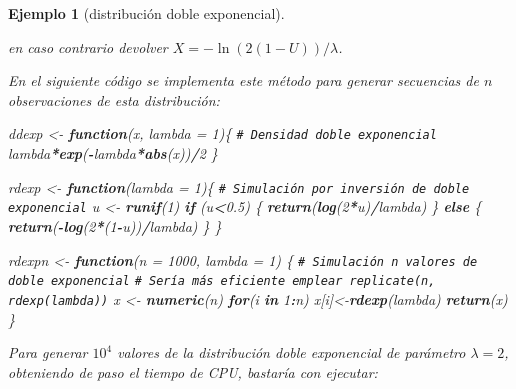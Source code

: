 \documentclass[
  spanish,
  10pt,
]{book}
\newenvironment{Shaded}{\begin{snugshade}}{\end{snugshade}}
\newcommand{\AttributeTok}[1]{\textcolor[rgb]{0.13,0.29,0.53}{#1}}
\newcommand{\CommentTok}[1]{\textcolor[rgb]{0.56,0.35,0.01}{\textit{#1}}}
\newcommand{\ControlFlowTok}[1]{\textcolor[rgb]{0.13,0.29,0.53}{\textbf{#1}}}
\newcommand{\DecValTok}[1]{\textcolor[rgb]{0.00,0.00,0.81}{#1}}
\newcommand{\FloatTok}[1]{\textcolor[rgb]{0.00,0.00,0.81}{#1}}
\newcommand{\FunctionTok}[1]{\textcolor[rgb]{0.13,0.29,0.53}{\textbf{#1}}}
\newcommand{\NormalTok}[1]{#1}
\newcommand{\OtherTok}[1]{\textcolor[rgb]{0.56,0.35,0.01}{#1}}
\newcommand{\SpecialCharTok}[1]{\textcolor[rgb]{0.81,0.36,0.00}{\textbf{#1}}}
\theoremstyle{break}
\newtheorem{example}{Ejemplo}[chapter]
\theoremstyle{nonumberplain}
\renewcommand{\CommentTok}[1]{\textcolor[rgb]{0.41,0.41,0.41}{\texttt{#1}}}
\begin{document}
\begin{example}[distribución doble exponencial]
\begin{enumerate}
  en caso contrario devolver \(X = - \ln \left( 2(1-U) \right)/\lambda\).
\end{enumerate}

En el siguiente código se implementa este método para generar secuencias de \(n\) observaciones de esta distribución:

\begin{Shaded}
\begin{Highlighting}[]
\NormalTok{ddexp }\OtherTok{\textless{}{-}} \ControlFlowTok{function}\NormalTok{(x, }\AttributeTok{lambda =} \DecValTok{1}\NormalTok{)\{}
\CommentTok{\# Densidad doble exponencial}
\NormalTok{  lambda}\SpecialCharTok{*}\FunctionTok{exp}\NormalTok{(}\SpecialCharTok{{-}}\NormalTok{lambda}\SpecialCharTok{*}\FunctionTok{abs}\NormalTok{(x))}\SpecialCharTok{/}\DecValTok{2}
\NormalTok{\}}

\NormalTok{rdexp }\OtherTok{\textless{}{-}} \ControlFlowTok{function}\NormalTok{(}\AttributeTok{lambda =} \DecValTok{1}\NormalTok{)\{}
\CommentTok{\# Simulación por inversión de doble exponencial}
\NormalTok{  u }\OtherTok{\textless{}{-}} \FunctionTok{runif}\NormalTok{(}\DecValTok{1}\NormalTok{)}
  \ControlFlowTok{if}\NormalTok{ (u}\SpecialCharTok{\textless{}}\FloatTok{0.5}\NormalTok{) \{}
    \FunctionTok{return}\NormalTok{(}\FunctionTok{log}\NormalTok{(}\DecValTok{2}\SpecialCharTok{*}\NormalTok{u)}\SpecialCharTok{/}\NormalTok{lambda)}
\NormalTok{  \} }\ControlFlowTok{else}\NormalTok{ \{}
    \FunctionTok{return}\NormalTok{(}\SpecialCharTok{{-}}\FunctionTok{log}\NormalTok{(}\DecValTok{2}\SpecialCharTok{*}\NormalTok{(}\DecValTok{1}\SpecialCharTok{{-}}\NormalTok{u))}\SpecialCharTok{/}\NormalTok{lambda)}
\NormalTok{  \}}
\NormalTok{\}}

\NormalTok{rdexpn }\OtherTok{\textless{}{-}} \ControlFlowTok{function}\NormalTok{(}\AttributeTok{n =} \DecValTok{1000}\NormalTok{, }\AttributeTok{lambda =} \DecValTok{1}\NormalTok{) \{}
\CommentTok{\# Simulación n valores de doble exponencial}
\CommentTok{\# Sería más eficiente emplear replicate(n, rdexp(lambda))}
\NormalTok{  x }\OtherTok{\textless{}{-}} \FunctionTok{numeric}\NormalTok{(n)}
  \ControlFlowTok{for}\NormalTok{(i }\ControlFlowTok{in} \DecValTok{1}\SpecialCharTok{:}\NormalTok{n) x[i]}\OtherTok{\textless{}{-}}\FunctionTok{rdexp}\NormalTok{(lambda)}
  \FunctionTok{return}\NormalTok{(x)}
\NormalTok{\}}
\end{Highlighting}
\end{Shaded}

Para generar \(10^{4}\) valores de la distribución doble exponencial de parámetro \(\lambda=2\), obteniendo de paso el tiempo de CPU, bastaría con ejecutar:


\end{example}
\end{document}
